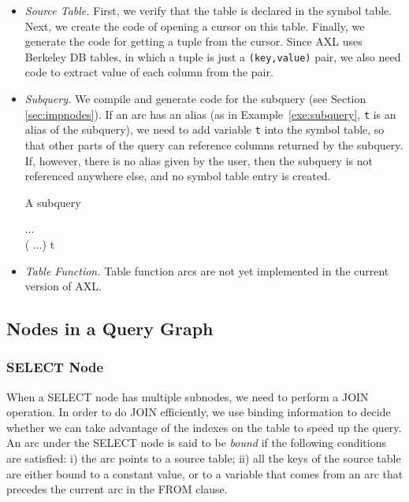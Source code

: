 \begin{itemize}
\item {\it Source Table.} First, we verify that the table is declared
  in the symbol table. Next, we create the code of opening a cursor on
  this table. Finally, we generate the code for getting a tuple from
  the cursor. Since AXL uses Berkeley DB tables, in which a tuple is
  just a {\tt (key,value)} pair, we also need code to extract value of
  each column from the pair.
\item {\it Subquery.} We compile and generate code for the subquery
  (see Section \ref{sec:impnodes}). If an arc has an alias (as in
  Example~\ref{exe:subquery}, {\tt t} is an alias of the subquery), we
  need to add variable {\tt t} into the symbol table, so that other
  parts of the query can reference columns returned by the subquery.
  If, however, there is no alias given by the user, then the subquery
  is not referenced anywhere else, and no symbol table entry is
  created.

\begin{example}{A subquery}
\begin{codedisplay}
...\\
 ( ...)  t
\end{codedisplay}
\label{exe:subquery}
\end{example}

\item {\it Table Function.} Table function arcs are not yet
  implemented in the current version of AXL.
\end{itemize}

\subsection{Nodes in a Query Graph\label{sec:impnodes}}
\subsubsection*{SELECT Node}
When a SELECT node has multiple subnodes, we need to perform a JOIN
operation. In order to do JOIN efficiently, we use binding information
to decide whether we can take advantage of the indexes on the table to
speed up the query. An arc under the SELECT node is said to be {\it
  bound} if the following conditions are satisfied: i) the arc points
to a source table; ii) all the keys of the source table are either
bound to a constant value, or to a variable that comes from an arc
that precedes the current arc in the FROM clause.

